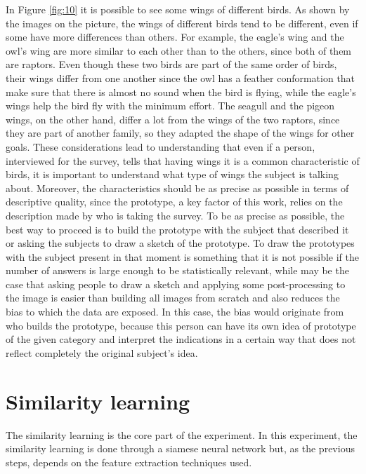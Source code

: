 \documentclass[conference]{IEEEtran}
\begin{document}
			\noindent In Figure \ref{fig:10} it is possible to see some wings of different birds. As shown by the images on the picture, the wings of different birds tend to be different, even if some have more 
			differences than others. For example, the eagle's wing and the owl's wing are more similar to each other than to the others, since both of them are raptors. Even though these two birds are part of 
			the same order of birds, their wings differ from one another since the owl has a feather conformation that make sure that there is almost no sound when the bird is flying, while the eagle's wings 
			help the bird fly with the minimum effort. The seagull and the pigeon wings, on the other hand, differ a lot from the wings of the two raptors, since they are part of another family, so they adapted 
			the shape of the wings for other goals. These considerations lead to understanding that even if a person, interviewed for the survey, tells that having wings it is a common characteristic of birds, 
			it is important to understand what type of wings the subject is talking about. Moreover, the characteristics should be as precise as possible in terms of descriptive quality, since the prototype, a 
			key factor of this work, relies on the description made by who is taking the survey. To be as precise as possible, the best way to proceed is to build the prototype with the subject that described it 
			or asking the subjects to draw a sketch of the prototype. To draw the prototypes with the subject present in that moment is something that it is not possible if the number of answers is large 
			enough to be statistically relevant, while may be the case that asking people to draw a sketch and applying some post-processing to the image is easier than building all images from scratch and also 
			reduces the bias to which the data are exposed. In this case, the bias would originate from who builds the prototype, because this person can have its own idea of prototype of the given category and 
			interpret the indications in a certain way that does not reflect completely the original subject's idea. 

	\section{Similarity learning}
	
		\noindent The similarity learning is the core part of the experiment. In this experiment, the similarity learning is done through a siamese neural network but, as the previous steps, depends on the 
		feature extraction techniques used. 
		
\end{document}
